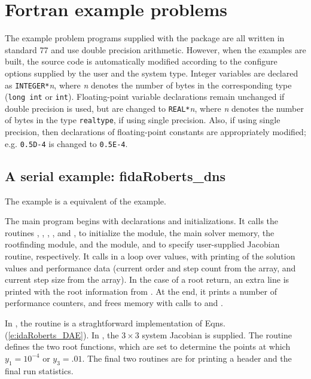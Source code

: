 \section{Fortran example problems}\label{s:ex_fortran}

The {\F} example problem programs supplied with the {\ida}
package are all written in standard {\F}77 and use double precision
arithmetic. However, when the {\F} examples are built, the source code is
automatically modified according to the configure options supplied by the
user and the system type. Integer variables are declared as {\tt INTEGER*}{\em n},
where {\em n} denotes the number of bytes in the corresponding {\CC} type
({\tt long int} or {\tt int}). Floating-point variable declarations remain
unchanged if double precision is used, but are changed to {\tt REAL*}{\em n},
where {\em n} denotes the number of bytes in the {\sundials} type {\tt realtype},
if using single precision. Also, if using single precision, then declarations of
floating-point constants are appropriately modified; e.g. {\tt 0.5D-4} is
changed to {\tt 0.5E-4}.


\subsection{A serial example: fidaRoberts\_dns}\label{ss:fidaRoberts}

The  example is a {\F} equivalent of the
 example.

The main program begins with declarations and initializations.  
It calls the routines , , , 
, and , to initialize the {\nvecs} module, 
the main solver memory, the rootfinding module, and the {\idadense} module, 
and to specify user-supplied Jacobian routine, respectively.
It calls  in a loop over  values, with printing of
the solution values and performance data (current order and step count
from the  array, and current step size from the  array).
In the case of a root return, an extra line is printed with the root
information from .  At the end, it prints a number of
performance counters, and frees memory with calls to 
and .

In , the  routine is a straghtforward
implementation of Eqns. (\ref{e:idaRoberts_DAE}).  In , the 
$3 \times 3$ system Jacobian is supplied.  The  routine
defines the two root functions, which are set to determine the points at which
$y_1 = 10^{-4}$ or $y_3 = .01$.  The final two routines are for
printing a header and the final run statistics.

